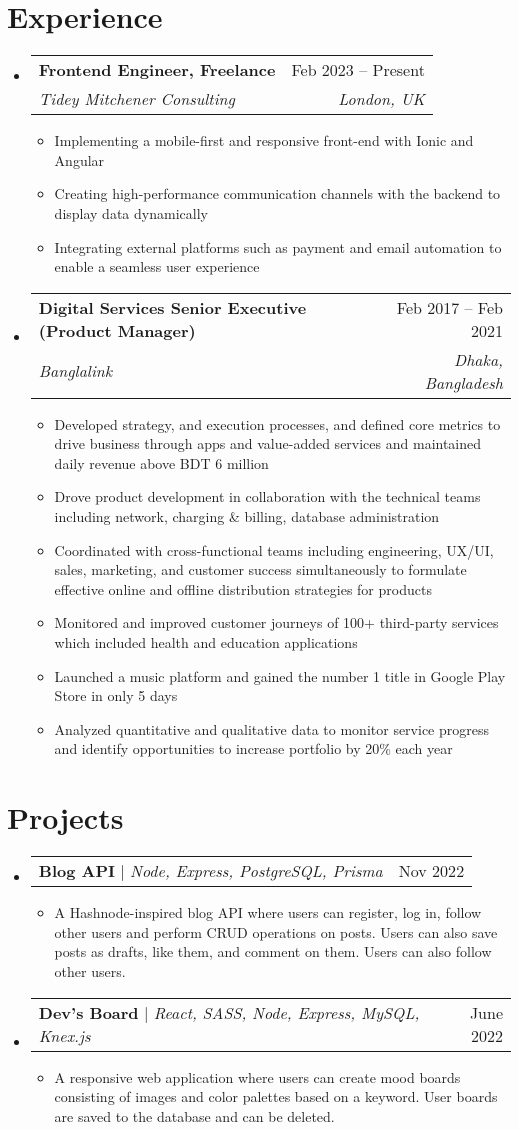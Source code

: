 \documentclass[letterpaper,11pt]{article}
\makeatletter
\newcommand{\resumeItem}[1]{
  \item\small{
    {#1 \vspace{-2pt}}
  }
}
\newcommand{\resumeSubheading}[4]{
  \vspace{-2pt}\item
    \begin{tabular*}{0.97\textwidth}[t]{l@{\extracolsep{\fill}}r}
      \textbf{#1} & #2 \\
      \textit{\small#3} & \textit{\small #4} \\
    \end{tabular*}\vspace{-7pt}
}
\newcommand{\resumeProjectHeading}[2]{
    \item
    \begin{tabular*}{0.97\textwidth}{l@{\extracolsep{\fill}}r}
      \small#1 & #2 \\
    \end{tabular*}\vspace{-7pt}
}
\newcommand{\resumeSubHeadingListStart}{\begin{itemize}[leftmargin=0.15in, label={}]}
\newcommand{\resumeSubHeadingListEnd}{\end{itemize}}
\newcommand{\resumeItemListStart}{\begin{itemize}}
\newcommand{\resumeItemListEnd}{\end{itemize}\vspace{-5pt}}
\makeatother
\begin{document}
\section{Experience}
  \resumeSubHeadingListStart

    \resumeSubheading
      {Frontend Engineer, Freelance}{Feb 2023 -- Present}
      {Tidey Mitchener Consulting}{London, UK}
      \resumeItemListStart
        \resumeItem{Implementing a mobile-first and responsive front-end with Ionic and Angular}
        \resumeItem{Creating high-performance communication channels with the backend to display data dynamically}
        \resumeItem{Integrating external platforms such as payment and email automation to enable a seamless user experience}
      \resumeItemListEnd

    \resumeSubheading
      {Digital Services Senior Executive (Product Manager)}{Feb 2017 – Feb 2021}
      {Banglalink}{Dhaka, Bangladesh}
      \resumeItemListStart
        \resumeItem{Developed strategy, and execution processes, and defined core metrics to drive business through apps and value-added services and maintained daily revenue above BDT 6 million}
        \resumeItem{Drove product development in collaboration with the technical teams including network, charging \& billing, database administration}
        \resumeItem{Coordinated with cross-functional teams including engineering, UX/UI, sales, marketing, and customer success simultaneously to formulate effective online and offline distribution strategies for products}
        \resumeItem{Monitored and improved customer journeys of 100+ third-party services which included health and education applications}
        \resumeItem{Launched a music platform and gained the number 1 title in Google Play Store in only 5 days}
        \resumeItem{Analyzed quantitative and qualitative data to monitor service progress and identify opportunities to increase portfolio by 20\% each year}
    \resumeItemListEnd

  \resumeSubHeadingListEnd


\section{Projects}
    \resumeSubHeadingListStart
      \resumeProjectHeading
          {\textbf{Blog API} $|$ \emph{Node, Express, PostgreSQL, Prisma}}{Nov 2022}
          \resumeItemListStart
            \resumeItem{A Hashnode-inspired blog API where users can register, log in, follow other users and perform CRUD operations on posts. Users can also save posts as drafts, like them, and comment on them. Users can also follow other users.}
          \resumeItemListEnd
      \resumeProjectHeading
          {\textbf{Dev's Board} $|$ \emph{React, SASS, Node, Express, MySQL, Knex.js}}{June 2022}
          \resumeItemListStart
            \resumeItem{A responsive web application where users can create mood boards consisting of images and color palettes based on a keyword. User boards are saved to the database and can be deleted.}
          \resumeItemListEnd
    \resumeSubHeadingListEnd
\end{document}
